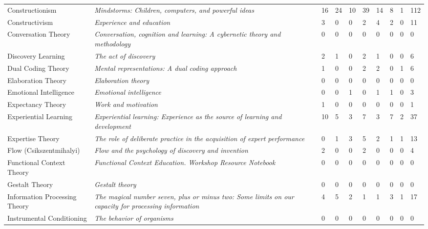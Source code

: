 \begin{table*}[t]
\begin{tabular}{p{3cm}p{7cm}llllllll}
Constructionism  & \textit{Mindstorms: Children, computers, and powerful ideas}~\cite{papert1980mindstorms} & 16 & 24 & 10 & 39 & 14 & 8 & 1 & 112\\
Constructivism & \textit{Experience and education}~\cite{dewey1986experience} & 3 & 0 & 0 & 2 & 4 & 2 & 0 & 11\\
Conversation Theory & \textit{Conversation, cognition and learning: A cybernetic theory and methodology}~\cite{pask1975conversation} & 0 & 0 & 0 & 0 & 0 & 0 & 0 & 0\\
Discovery Learning & \textit{The act of discovery}~\cite{bruner1961act} & 2 & 1 & 0 & 2 & 1 & 0 & 0 & 6\\
Dual Coding Theory & \textit{Mental representations: A dual coding approach}~\cite{paivio1990mental} & 1 & 0 & 0 & 2 & 2 & 0 & 1 & 6\\
Elaboration Theory & \textit{Elaboration theory}~\cite{reigeluth1983elaboration} & 0 & 0 & 0 & 0 & 0 & 0 & 0 & 0\\
Emotional Intelligence & \textit{Emotional intelligence}~\cite{goleman1995emotional} & 0 & 0 & 1 & 0 & 1 & 1 & 0 & 3\\
Expectancy Theory & \textit{Work and motivation}~\cite{vroom1964work} & 1 & 0 & 0 & 0 & 0 & 0 & 0 & 1\\
Experiential Learning & \textit{Experiential learning: Experience as the source of learning and development}~\cite{kolb1984experiential} & 10 & 5 & 3 & 7 & 3 & 7 & 2 & 37\\
Expertise Theory & \textit{The role of deliberate practice in the acquisition of expert performance}~\cite{ericsson1993role} & 0 & 1 & 3 & 5 & 2 & 1 & 1 & 13\\
Flow (Csikszentmihalyi) & \textit{Flow and the psychology of discovery and invention}~\cite{csikszentmihalyi1997flow} & 2 & 0 & 0 & 2 & 0 & 0 & 0 & 4\\
Functional Context Theory & \textit{Functional Context Education. Workshop Resource Notebook}~\cite{sticht1987functional} & 0 & 0 & 0 & 0 & 0 & 0 & 0 & 0\\
Gestalt Theory & \textit{Gestalt theory}~\cite{wertheimer1938gestalt} & 0 & 0 & 0 & 0 & 0 & 0 & 0 & 0\\
Information Processing Theory & \textit{The magical number seven, plus or minus two: Some limits on our capacity for processing information}~\cite{miller1956magical} & 4 & 5 & 2 & 1 & 1 & 3 & 1 & 17\\
Instrumental Conditioning & \textit{The behavior of organisms}~\cite{skinner1938behavior} & 0 & 0 & 0 & 0 & 0 & 0 & 0 & 0\\

\end{tabular}
\end{table*}
